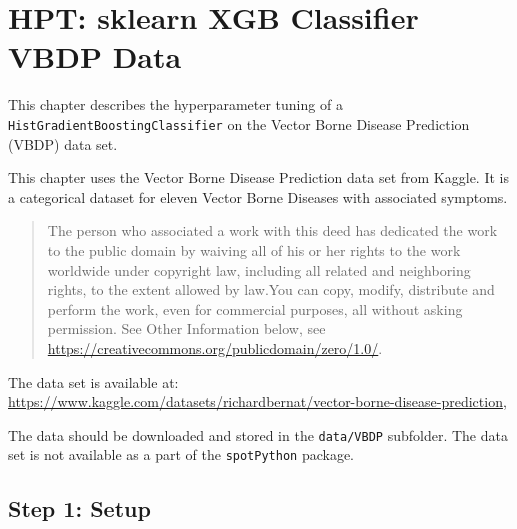 \documentclass[
  letterpaper,
  DIV=11,
  numbers=noendperiod]{scrreprt}
\begin{document}
\hypertarget{sec-hpt-sklearn-xgb-classifier-vbdp-data}{%
\chapter{HPT: sklearn XGB Classifier VBDP
Data}\label{sec-hpt-sklearn-xgb-classifier-vbdp-data}}

This chapter describes the hyperparameter tuning of a
\texttt{HistGradientBoostingClassifier} on the Vector Borne Disease
Prediction (VBDP) data set.

\begin{tcolorbox}[enhanced jigsaw, rightrule=.15mm, opacityback=0, colframe=quarto-callout-important-color-frame, opacitybacktitle=0.6, toptitle=1mm, arc=.35mm, colbacktitle=quarto-callout-important-color!10!white, coltitle=black, toprule=.15mm, leftrule=.75mm, titlerule=0mm, title=\textcolor{quarto-callout-important-color}{\faExclamation}\hspace{0.5em}{Vector Borne Disease Prediction Data Set}, bottomrule=.15mm, breakable, bottomtitle=1mm, left=2mm, colback=white]

This chapter uses the Vector Borne Disease Prediction data set from
Kaggle. It is a categorical dataset for eleven Vector Borne Diseases
with associated symptoms.

\begin{quote}
The person who associated a work with this deed has dedicated the work
to the public domain by waiving all of his or her rights to the work
worldwide under copyright law, including all related and neighboring
rights, to the extent allowed by law.You can copy, modify, distribute
and perform the work, even for commercial purposes, all without asking
permission. See Other Information below, see
\url{https://creativecommons.org/publicdomain/zero/1.0/}.
\end{quote}

The data set is available at:
\url{https://www.kaggle.com/datasets/richardbernat/vector-borne-disease-prediction},

The data should be downloaded and stored in the \texttt{data/VBDP}
subfolder. The data set is not available as a part of the
\texttt{spotPython} package.

\end{tcolorbox}

\hypertarget{sec-setup-17}{%
\section{Step 1: Setup}\label{sec-setup-17}}
\end{document}
